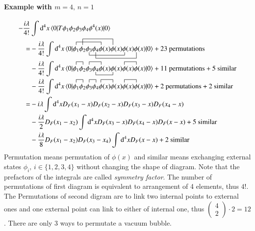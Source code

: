 \paragraph{Example with $m=4 ,\, n=1$}
\begin{align*}
	-\frac{i\lambda}{4!} &\int \dd^4 x \braket{0 | T \phi_1 \phi_2 \phi_3 \phi_4 \phi^4(x) | 0} \\
	= &-\frac{i\lambda}{4!}  \int \dd^4 x \braket{0 |
		\acontraction{}{\phi_1}{\phi_2 \phi_3 \phi_4}{\phi}
		\acontraction[2ex]{\phi_1}{\phi_2}{\phi_3 \phi_4 \phi(x)}{\phi}
		\bcontraction[1ex]{\phi_1\phi_2}{\phi_3}{\phi_4 \phi(x) \phi(x)}{\phi}
		\bcontraction[2ex]{\phi_1 \phi_2 \phi_3}{\phi_4}{\phi(x) \phi(x) \phi(x)}{\phi}
		\phi_1 \phi_2 \phi_3 \phi_4 \phi(x) \phi(x) \phi(x) \phi(x) 
		| 0} + \text{23 permutations} \\
	& -\frac{i\lambda}{4!}  \int \dd^4 x  \braket{0 | 
		\acontraction{}{\phi_1}{}{\phi_2}
		\acontraction{\phi_1\phi_2}{\phi_3}{\phi_4}{\phi}
		\bcontraction{\phi_1 \phi_2 \phi_3}{\phi_4}{\phi(x)}{\phi}
		\acontraction{\phi_1 \phi_2 \phi_3 \phi_4 \phi(x)\phi(x)}{\phi}{(x)}{\phi}
		\phi_1 \phi_2 \phi_3 \phi_4 \phi(x)\phi(x)\phi(x)\phi(x) 
		| 0} + \text{11 permutations} + \text{5 similar} \\
	& -\frac{i\lambda}{4!}  \int \dd^4 x  \braket{0 | 
		\contraction{}{\phi_1}{}{\phi_2}\phi_1 \phi_2 \contraction{}{\phi_3}{}{\phi_4}\phi_3 \phi_4 \contraction{}{\phi}{(x)}{\phi}\phi(x)\phi(x)\contraction{}{\phi}{(x)}{\phi}\phi(x)\phi(x) 
	| 0} + \text{2 permutations} + \text{2 similar} \\
		=& -i\lambda \int \dd^4 x D_F(x_1 - x) D_F(x_2 - x) D_F(x_3 - x) D_F(x_4 - x) \\
	&- \frac{i\lambda}{2} D_F(x_1 - x_2) \int \dd^4 x D_F(x_3 - x) D_F(x_4 - x) D_F(x-x)+ \text{5 similar} \\
	& -\frac{i\lambda}{8} D_F(x_1 - x_2) D_F(x_3 - x_4) \int \dd^4 x D_F(x-x) + \text{2 similar}
\end{align*}
Permutation means permutation of $\phi(x)$ and similar means exchanging external states $\phi_i, \,i \in \{1,2,3,4 \}$ without changing the shape of diagram. Note that the prefactors of the integrals are called \textit{symmetry factor}. The number of permutations of first diagram is equivalent to arrangement of 4 elements, thus $4!$. The Permutations of second digram are to link two internal points to external ones and one external point can link to either of internal one, thus $ \begin{pmatrix} 4 \\ 2\end{pmatrix}\cdot 2 = 12$. There are only 3 ways to permutate a vacuum bubble.

